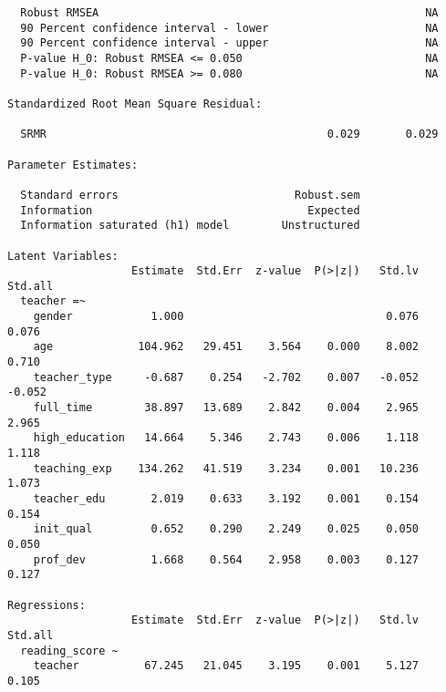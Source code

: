 \documentclass[
]{article}
\begin{document}
\begin{verbatim}
  Robust RMSEA                                                  NA
  90 Percent confidence interval - lower                        NA
  90 Percent confidence interval - upper                        NA
  P-value H_0: Robust RMSEA <= 0.050                            NA
  P-value H_0: Robust RMSEA >= 0.080                            NA

Standardized Root Mean Square Residual:

  SRMR                                           0.029       0.029

Parameter Estimates:

  Standard errors                           Robust.sem
  Information                                 Expected
  Information saturated (h1) model        Unstructured

Latent Variables:
                   Estimate  Std.Err  z-value  P(>|z|)   Std.lv  Std.all
  teacher =~                                                            
    gender            1.000                               0.076    0.076
    age             104.962   29.451    3.564    0.000    8.002    0.710
    teacher_type     -0.687    0.254   -2.702    0.007   -0.052   -0.052
    full_time        38.897   13.689    2.842    0.004    2.965    2.965
    high_education   14.664    5.346    2.743    0.006    1.118    1.118
    teaching_exp    134.262   41.519    3.234    0.001   10.236    1.073
    teacher_edu       2.019    0.633    3.192    0.001    0.154    0.154
    init_qual         0.652    0.290    2.249    0.025    0.050    0.050
    prof_dev          1.668    0.564    2.958    0.003    0.127    0.127

Regressions:
                   Estimate  Std.Err  z-value  P(>|z|)   Std.lv  Std.all
  reading_score ~                                                       
    teacher          67.245   21.045    3.195    0.001    5.127    0.105


\end{verbatim}
\end{document}
